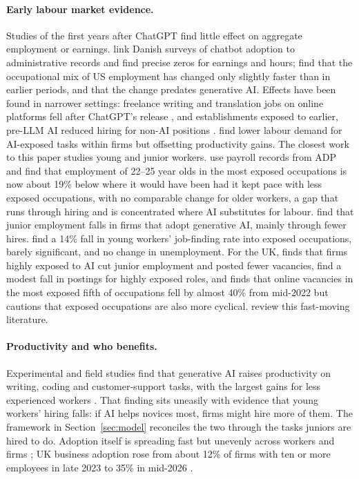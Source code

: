 \documentclass[11pt]{article}
\begin{document}
\paragraph{Early labour market evidence.} Studies of the first years after ChatGPT find little effect on aggregate employment or earnings. \citet{humlum2025nber} link Danish surveys of chatbot adoption to administrative records and find precise zeros for earnings and hours; \citet{gimbel2025} find that the occupational mix of US employment has changed only slightly faster than in earlier periods, and that the change predates generative AI. Effects have been found in narrower settings: freelance writing and translation jobs on online platforms fell after ChatGPT's release \citep{hui2024,demirci2025}, and establishments exposed to earlier, pre-LLM AI reduced hiring for non-AI positions \citep{aahr2022}. \citet{hampole2025} find lower labour demand for AI-exposed tasks within firms but offsetting productivity gains. The closest work to this paper studies young and junior workers. \citet{brynjolfsson2025canaries} use payroll records from ADP and find that employment of 22--25 year olds in the most exposed occupations is now about 19\% below where it would have been had it kept pace with less exposed occupations, with no comparable change for older workers, a gap that runs through hiring and is concentrated where AI substitutes for labour. \citet{hosseini2025} find that junior employment falls in firms that adopt generative AI, mainly through fewer hires. \citet{massenkoff2026} find a 14\% fall in young workers' job-finding rate into exposed occupations, barely significant, and no change in unemployment. For the UK, \citet{teeselink2025} finds that firms highly exposed to AI cut junior employment and posted fewer vacancies, \citet{henseke2025} find a modest fall in postings for highly exposed roles, and \citet{egan2026} finds that online vacancies in the most exposed fifth of occupations fell by almost 40\% from mid-2022 but cautions that exposed occupations are also more cyclical. \citet{delriochanona2025} review this fast-moving literature.

\paragraph{Productivity and who benefits.} Experimental and field studies find that generative AI raises productivity on writing, coding and customer-support tasks, with the largest gains for less experienced workers \citep{noy2023,peng2023,dellacqua2023,brynjolfsson2025qje}. That finding sits uneasily with evidence that young workers' hiring falls: if AI helps novices most, firms might hire more of them. The framework in Section~\ref{sec:model} reconciles the two through the tasks juniors are hired to do. Adoption itself is spreading fast \citep{bick2024} but unevenly across workers and firms \citep{humlum2025pnas,appel2025}; UK business adoption rose from about 12\% of firms with ten or more employees in late 2023 to 35\% in mid-2026 \citep{ons2026ai}.
\end{document}
